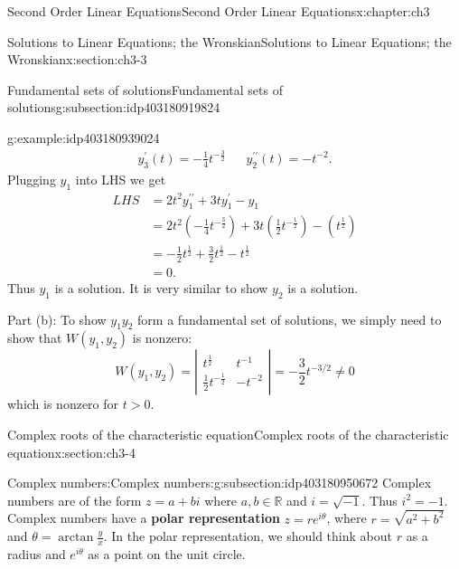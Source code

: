 \documentclass[oneside,10pt,]{book}
\newcommand{\terminology}[1]{\textbf{#1}}
\numberwithin{equation}{section}
\numberwithin{equation}{section}
\newcommand{\amp}{&}
\begin{document}
\begin{chapterptx}{Second Order Linear Equations}{}{Second Order Linear Equations}{}{}{x:chapter:ch3}
\begin{sectionptx}{Solutions to Linear Equations; the Wronskian}{}{Solutions to Linear Equations; the Wronskian}{}{}{x:section:ch3-3}
\begin{subsectionptx}{Fundamental sets of solutions}{}{Fundamental sets of solutions}{}{}{g:subsection:idp403180919824}
\begin{example}{}{g:example:idp403180939024}
\begin{equation*}
\begin{array}{ccc}
y_{3}^{\prime}(t)=-\frac{1}{4}t^{-\frac{3}{2}} \amp  \amp y_{2}^{\prime\prime}(t)=-t^{-2}.
\end{array}
\end{equation*}
Plugging \(y_{1}\) into LHS we get%
\begin{align*}
LHS \amp =2t^{2}y_{1}^{\prime\prime}+3ty_{1}^{\prime}-y_{1}\\
\amp =2t^{2}\left(-\frac{1}{4}t^{-\frac{3}{2}}\right)+3t\left(\frac{1}{2}t^{-\frac{1}{2}}\right)-\left(t^{\frac{1}{2}}\right)\\
\amp =-\frac{1}{2}t^{\frac{1}{2}}+\frac{3}{2}t^{\frac{1}{2}}-t^{\frac{1}{2}}\\
\amp =0.
\end{align*}
Thus \(y_{1}\) is a solution. It is very similar to show \(y_{2}\) is a solution.%
\par
Part (b): To show \(y_{1}y_{2}\) form a fundamental set of solutions, we simply need to show that \(W(y_{1},y_{2})\) is nonzero:%
\begin{equation*}
W(y_{1},y_{2})=\left|\begin{array}{cc}
t^{\frac{1}{2}} \amp t^{-1}\\
\frac{1}{2}t^{-\frac{1}{2}} \amp -t^{-2}
\end{array}\right|=-\frac{3}{2}t^{-3/2}\neq0
\end{equation*}
which is nonzero for \(t>0\).%
\end{example}
\end{subsectionptx}
\end{sectionptx}
%
%
\typeout{************************************************}
\typeout{************************************************}
%
\begin{sectionptx}{Complex roots of the characteristic equation}{}{Complex roots of the characteristic equation}{}{}{x:section:ch3-4}
%
%
\typeout{************************************************}
\typeout{************************************************}
%
\begin{subsectionptx}{Complex numbers:}{}{Complex numbers:}{}{}{g:subsection:idp403180950672}
Complex numbers are of the form \(z = a+bi\) where \(a,b\in\mathbb{R}\) and \(i=\sqrt{-1}\). Thus \(i^{2}=-1\). Complex numbers have a \terminology{polar representation} \(z = r e^{i\theta}\), where \(r = \sqrt{a^2 + b^2}\) and \(\theta = \arctan\frac{y}{x}\). In the polar representation, we should think about \(r\) as a radius and \(e^{i\theta}\) as a point on the unit circle.%

\end{subsectionptx}
\end{sectionptx}
\end{chapterptx}
\end{document}
